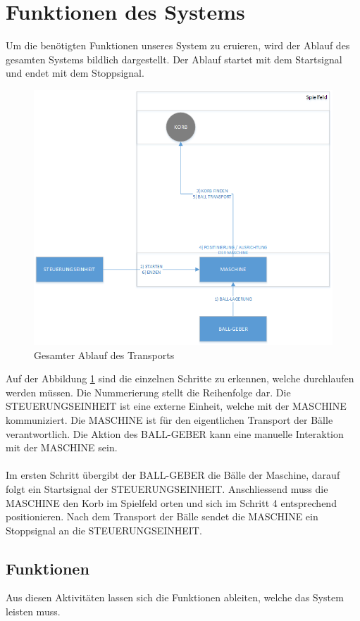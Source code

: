 \section{Funktionen des Systems}
Um die benötigten Funktionen unseres System zu eruieren, wird der Ablauf des gesamten Systems bildlich dargestellt. Der Ablauf startet mit dem Startsignal und endet mit dem Stoppsignal.

\begin{figure}[h!]
\centering
\includegraphics[width=0.7\linewidth]{../../fig/ablauf-transport}
\caption[Gesamter Ablauf des Transports]{Gesamter Ablauf des Transports}
\label{fig:ablauf-transport}
\end{figure}

Auf der Abbildung \ref{fig:ablauf-transport} sind die einzelnen Schritte zu erkennen, welche durchlaufen werden müssen. Die Nummerierung stellt die Reihenfolge dar. Die STEUERUNGSEINHEIT ist eine externe Einheit, welche mit der MASCHINE kommuniziert. Die MASCHINE ist für den eigentlichen Transport der Bälle verantwortlich. Die Aktion des BALL-GEBER kann eine manuelle Interaktion mit der MASCHINE sein.\\
\\
Im ersten Schritt übergibt der BALL-GEBER die Bälle der Maschine, darauf folgt ein Startsignal der STEUERUNGSEINHEIT. Anschliessend muss die MASCHINE den Korb im Spielfeld orten und sich im Schritt 4 entsprechend positionieren. Nach dem Transport der Bälle sendet die MASCHINE ein Stoppsignal an die STEUERUNGSEINHEIT.

\subsection{Funktionen}
Aus diesen Aktivitäten lassen sich die Funktionen ableiten, welche das System leisten muss.\\
 
